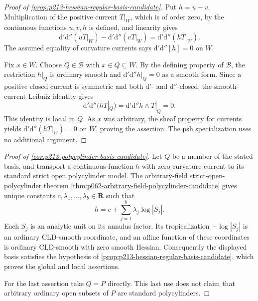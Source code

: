 
\begin{proof}[Proof of
\cref{prop:p213-hessian-regular-basis-candidate}]
Put \(h=u-v\).  Multiplication of the positive current \(T|_W\), which is
of order zero, by the continuous functions \(u,v,h\) is defined, and
linearity gives
\[
 \mathrm d'\mathrm d''(uT|_W)
 -\mathrm d'\mathrm d''(vT|_W)
 =\mathrm d'\mathrm d''(hT|_W).
\]
The assumed equality of curvature currents says
\(\mathrm d'\mathrm d''[h]=0\) on \(W\).

Fix \(x\in W\).  Choose \(Q\in\mathscr B\) with
\(x\in Q\subseteq W\).  By the defining property of \(\mathscr B\), the
restriction \(h|_Q\) is ordinary smooth and
\(\mathrm d'\mathrm d''h|_Q=0\) as a smooth form.  Since a positive closed
current is symmetric and both \(\mathrm d'\)- and
\(\mathrm d''\)-closed, the smooth-current Leibniz identity gives
\[
 \mathrm d'\mathrm d''\bigl(hT|_Q\bigr)
 =\mathrm d'\mathrm d''h\wedge T|_Q=0.
\]
This identity is local in \(Q\).  As \(x\) was arbitrary, the sheaf property
for currents yields
\(\mathrm d'\mathrm d''(hT|_W)=0\) on \(W\), proving the assertion.  The
psh specialization uses no additional argument.
\end{proof}

\begin{proof}[Proof of \cref{cor:p213-polycylinder-basis-candidate}]
Let \(Q\) be a member of the stated basis, and transport a continuous
function \(h\) with zero curvature current to its standard strict open
polycylinder model.  The arbitrary-field strict-open-polycylinder theorem
\cref{thm:p062-arbitrary-field-polycylinder-candidate} gives unique
constants \(c,\lambda_1,\ldots,\lambda_b\in\mathbf R\) such that
\[
                    h=c+\sum_{j=1}^{b}\lambda_j\log|S_j|.
\]
Each \(S_j\) is an analytic unit on its annulus factor.  Its tropicalization
\(-\log|S_j|\) is an ordinary CLD-smooth coordinate, and an affine function
of these coordinates is ordinary CLD-smooth with zero smooth Hessian.
Consequently the displayed basis satisfies the hypothesis of
\cref{prop:p213-hessian-regular-basis-candidate}, which proves the global
and local assertions.

For the last assertion take \(Q=P\) directly.  This last use does not claim
that arbitrary ordinary open subsets of \(P\) are standard polycylinders.
\end{proof}
